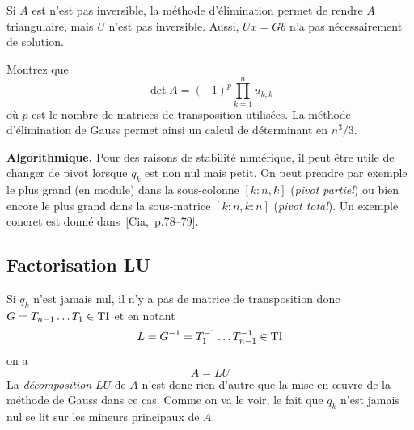 \begin{remark}
Si $A$ est n'est pas inversible, la méthode d'élimination permet de rendre
$A$ triangulaire, mais $U$ n'est pas inversible. Aussi, $Ux = Gb$ n'a pas
nécessairement de solution.
\end{remark}

\begin{exercice}
Montrez que
\[
\det A = (-1)^p \prod_{k=1}^n u_{k,k}
\]
où $p$ est le nombre de matrices de transposition utilisées. La méthode
d'élimination de Gauss permet ainsi un calcul de déterminant en
$\displaystyle {n^3}/{3}$.
\end{exercice}

{\bf Algorithmique.}
Pour des raisons de stabilité numérique, il peut être utile de changer de
pivot lorsque $q_k$ est non nul mais petit. On peut prendre par exemple le
plus grand (en module) dans la sous-colonne $[k:n,k]$ (\emph{pivot partiel})
ou bien encore le plus grand dans la sous-matrice $[k:n,k:n]$ (\emph{pivot
total}). Un exemple concret est donné dans~[Cia,~p.78--79].


\subsection{Factorisation LU}

Si $q_k$ n'est jamais nul, il n'y a pas de matrice de transposition donc $G =
T_{n-1}\dots T_1 \in \mathrm{TI}$ et en notant $$L = G^{-1} = T_1^{-1} \dots
T_{n-1}^{-1} \in \mathrm{TI}$$ on a
\[
A = LU
\]
La \emph{décomposition} $LU$ de $A$ n'est donc rien d'autre que la mise en
\oe uvre de la méthode de Gauss dans ce cas. Comme on va le voir, le fait que
$q_k$ n'est jamais nul se lit sur les mineurs principaux de $A$.

